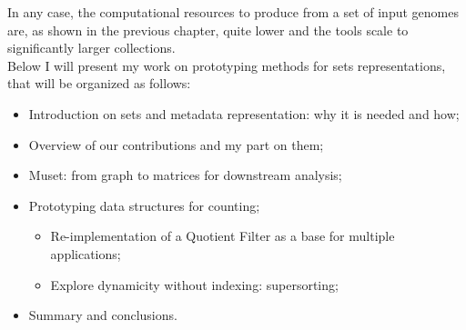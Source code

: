 In any case, the computational resources to produce \ccdbg from a set of input genomes are, as shown in the previous chapter, quite lower and the tools scale to significantly larger collections.\\
Below I will present my work on prototyping methods for \kmer sets representations, that will be organized as follows:
\begin{itemize}
	\item Introduction on \kmer sets and metadata representation: why it is needed and how;
	\item Overview of our contributions and my part on them;
	\item Muset: from graph to matrices for downstream analysis;
	\item Prototyping data structures for \kmer counting;
	\begin{itemize}
		\item Re-implementation of a Quotient Filter as a base for multiple applications;
		\item Explore dynamicity without indexing: super\kmer sorting;
	\end{itemize}
	\item Summary and conclusions.
\end{itemize}

